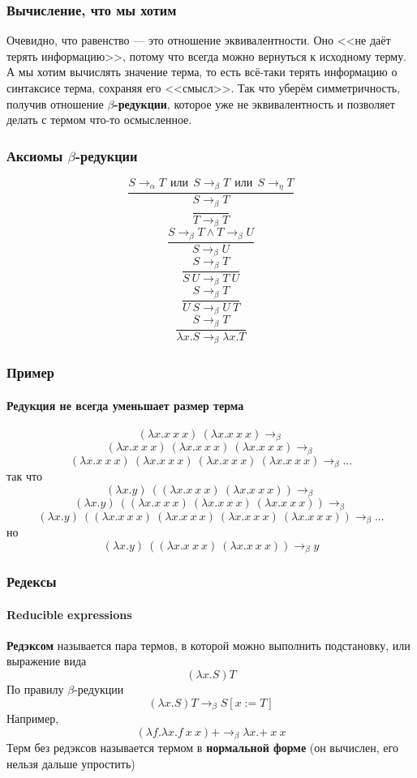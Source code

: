 \documentclass{../../slides-style}
\begin{document}
    \begin{frame}
        \frametitle{Вычисление, что мы хотим}
        Очевидно, что равенство --- это отношение эквивалентности. Оно <<не даёт терять
        информацию>>, потому что всегда можно вернуться к исходному терму. А мы хотим 
        вычислять значение терма, то есть всё-таки терять информацию о синтаксисе 
        терма, сохраняя	его <<смысл>>. Так что уберём симметричность, получив 
        отношение \textbf{$\beta$-редукции}, которое уже не эквивалентность и позволяет 
        делать с термом что-то осмысленное.
    \end{frame}

    \begin{frame}
        \frametitle{Аксиомы $\beta$-редукции}
        $$\dfrac{S \rightarrow_\alpha T\ \ 
            \mbox{или}\ \ S \rightarrow_\beta T\ \ 
            \mbox{или}\ \  S \rightarrow_\eta T}{S \rightarrow_\beta T}$$ 
        $$\dfrac{}{T \rightarrow_\beta T}$$
        $$\dfrac{S \rightarrow_\beta T \wedge T \rightarrow_\beta U}{S \rightarrow_\beta U}$$
        $$\dfrac{S \rightarrow_\beta T}{S\ U \rightarrow_\beta T\ U}$$
        $$\dfrac{S \rightarrow_\beta T}{U\ S \rightarrow_\beta U\ T}$$
        $$\dfrac{S \rightarrow_\beta T}{\lambda x.S \rightarrow_\beta \lambda x.T}$$
    \end{frame}

    \begin{frame}
        \frametitle{Пример}
        \framesubtitle{Редукция не всегда уменьшает размер терма}
        $$(\lambda x.x\ x\ x)\ (\lambda x.x\ x\ x) \rightarrow_\beta$$ 
        $$(\lambda x.x\ x\ x)\ (\lambda x.x\ x\ x)\ (\lambda x.x\ x\ x) \rightarrow_\beta$$
        $$(\lambda x.x\ x\ x)\ (\lambda x.x\ x\ x)\ (\lambda x.x\ x\ x)\ (\lambda x.x\ x\ x) \rightarrow_\beta ...$$
        так что 
        $$(\lambda x.y)\ ((\lambda x.x\ x\ x)\ (\lambda x.x\ x\ x)) \rightarrow_\beta$$ 
        $$(\lambda x.y)\ ((\lambda x.x\ x\ x)\ (\lambda x.x\ x\ x)\ (\lambda x.x\ x\ x)) \rightarrow_\beta$$
        $$(\lambda x.y)\ ((\lambda x.x\ x\ x)\ (\lambda x.x\ x\ x)\ (\lambda x.x\ x\ x)\ (\lambda x.x\ x\ x)) \rightarrow_\beta ...$$
        но
        $$(\lambda x.y)\ ((\lambda x.x\ x\ x)\ (\lambda x.x\ x\ x)) \rightarrow_\beta y$$		
    \end{frame}
    
    \begin{frame}
        \frametitle{Редексы}
        \framesubtitle{Reducible expressions}
        \textbf{Редэксом} называется пара термов, в которой можно выполнить подстановку, или выражение вида
        $$(\lambda x.S) T$$ 
        По правилу $\beta$-редукции 
        $$(\lambda x.S) T \rightarrow_\beta S[x := T]$$
        Например,
        $$(\lambda f.\lambda x.f\ x\ x) \textbf{+} \rightarrow_\beta \lambda x.\textbf{+}\ x\ x$$
        Терм без редэксов называется термом в \textbf{нормальной форме} (он вычислен, его нельзя дальше упростить)
    \end{frame}
\end{document}
